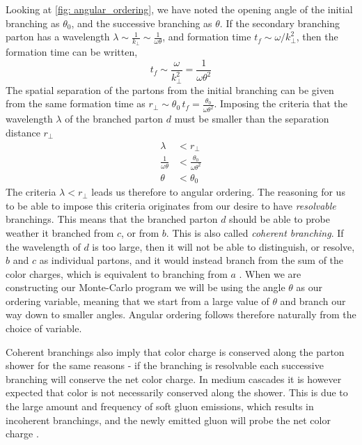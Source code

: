 \documentclass[main.tex]{subfiles}
\begin{document}
Looking at \autoref{fig: angular_ordering}, we have noted the opening angle of the initial branching as \(\theta_0\), and the successive branching as \(\theta\). If the secondary branching parton has a wavelength \(\lambda \sim \frac{1}{k_\perp} \sim \frac{1}{\omega \theta}\), and formation time \(t_f\sim \omega/k_\perp^2\), then the formation time can be written, 
\begin{equation}
    t_f \sim \frac{\omega}{k_\perp^2} = \frac{1}{\omega \theta^2}
\end{equation}
The spatial separation of the partons from the initial branching can be given from the same formation time as \(r_\perp \sim \theta_0\, t_f = \frac{\theta_0}{\omega \theta^2}\). Imposing the criteria that the wavelength \(\lambda\) of the branched parton \(d\) must be smaller than the separation distance \(r_\perp\)
\begin{align}\label{eqn: angular_ordering}
    \lambda &< r_\perp \nonumber \\
    \frac{1}{\omega \theta} &< \frac{\theta_0}{\omega \theta^2} \nonumber \\
    \theta &< \theta_0
\end{align}
The criteria \(\lambda < r_\perp\) leads us therefore to angular ordering. The reasoning for us to be able to impose this criteria originates from our desire to have \emph{resolvable} branchings. This means that the branched parton \(d\) should be able to probe weather it branched from \(c\), or from \(b\). This is also called \emph{coherent branching}. If the wavelength of \(d\) is too large, then it will not be able to distinguish, or resolve, \(b\) and \(c\) as individual partons, and it would instead branch from the sum of the color charges, which is equivalent to branching from \(a\) \cite{Dokshitzer:1991wu}. When we are constructing our Monte-Carlo program we will be using the angle \(\theta\) as our ordering variable, meaning that we start from a large value of \(\theta\) and branch our way down to smaller angles. Angular ordering follows therefore naturally from the choice of variable.

Coherent branchings also imply that color charge is conserved along the parton shower for the same reasons - if the branching is resolvable each successive branching will conserve the net color charge. In medium cascades it is however expected that color is not necessarily conserved along the shower. This is due to the large amount and frequency of soft gluon emissions, which results in incoherent branchings, and the newly emitted gluon will probe the net color charge \cite{medium_induced_gluon_branching}.
\end{document}
